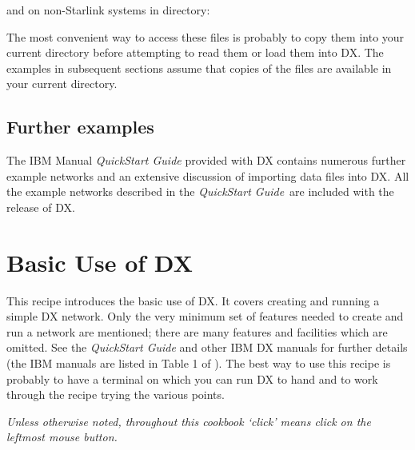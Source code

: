 \documentclass[twoside,11pt]{starlink}
\begin{document}
and on non-Starlink systems in directory:

The most convenient way to access these files is probably to copy them
into your current directory before attempting to read them or load
them into DX.  The examples in subsequent sections assume that copies
of the files are available in your current directory.

\subsection{Further examples}

The IBM Manual \textit{QuickStart Guide}\cite{QUICKS} provided with DX contains
numerous further example networks and an extensive discussion of
importing data files into DX. All the example networks described in the
\textit{QuickStart Guide}\, are included with the release of DX.


\newpage
\section{\label{BASIC}Basic Use of DX}

This recipe introduces the basic use of DX. It covers creating and
running a simple DX network. Only the very minimum set of features needed
to create and run a network are mentioned; there are many features and
facilities which are omitted. See the \textit{QuickStart Guide}\cite{QUICKS}
and other IBM DX manuals for further details (the IBM manuals are listed
in Table 1 of \cite{SUN203}). The best way to use
this recipe is probably to have a terminal on which you can run DX to
hand and to work through the recipe trying the various points.

\textit{Unless otherwise noted, throughout this cookbook `click' means click
on the leftmost mouse button.}
\end{document}
